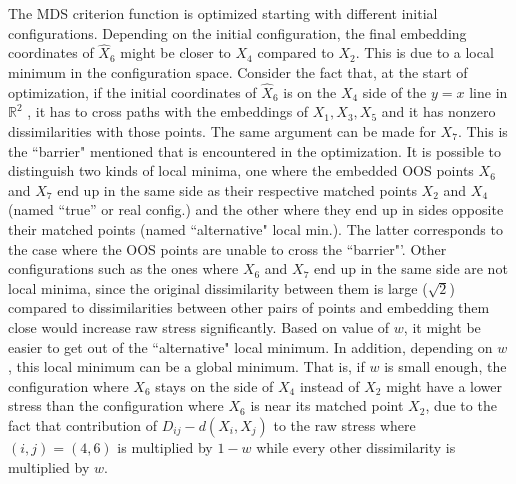 \documentclass[11pt]{article} %
\begin{document}
The MDS criterion function is optimized starting with different initial configurations.   Depending on the initial configuration, the final embedding coordinates of $\hat{X}_6$ might be closer
    to $X_4$ compared to $X_2$. This is due to a local minimum in the configuration space. Consider the fact that, at the start of optimization, if  the initial coordinates of $\hat{X}_6$ is on the $X_4$ side of the $y=x$ line  in  $\mathbb{R}^2$ , 
    it has to cross paths with the embeddings of  ${X}_1,{X}_3,{X}_5$ and it has   nonzero dissimilarities with those points. The same argument can be made for $X_7$. This is  the ``barrier" mentioned that is encountered in the optimization. It is possible to distinguish two kinds of local minima, one where the embedded OOS points $X_6$ and $X_7$ end up in the same side as their respective matched points $X_2$ and $X_4$ (named ``true'' or real config.) and the other where they end up in sides  opposite their matched points (named ``alternative" local min.). The latter corresponds to the case where the OOS points are unable to cross the ``barrier"'. Other configurations such as the ones where $X_6$ and $X_7$  end up in the same side are not local minima, since the original dissimilarity between them is large ($\sqrt{2}$) compared to dissimilarities between other pairs of points and embedding them close would increase raw stress significantly.
    Based on value of $w$, it might be easier to get out of the  ``alternative" local minimum. 
    In addition, depending on $w$ , this  local minimum can be a global minimum. 
    That is, if $w$ is small enough, the configuration where $X_6$ stays on the side of $X_4$ instead of $X_2$ might have a lower stress than the configuration where $X_6$ is near its matched point $X_2$, due to the fact that  contribution of $ D_{ij}-d(X_i,X_j)$ to the raw stress where $(i,j)=(4,6)$  is  multiplied by $1-w$ while every other dissimilarity is multiplied by $w$. 
		
\end{document}
